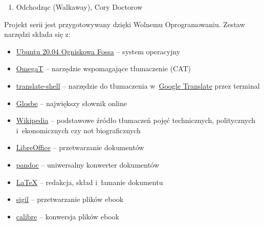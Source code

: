 \documentclass[oneside,polish,11pt,sfheadings]{mwbk}
\begin{document}
\begin{enumerate}
\item Odchodząc (Walkaway), Cory Doctorow
\end{enumerate}

\newpage

Projekt serii jest przygotowywany dzięki Wolnemu Oprogramowaniu. Zestaw narzędzi składa się z:
\begin{itemize}
\item \href{https://ubuntu.com/}{Ubuntu 20.04 Ogniskowa Fossa} -- system operacyjny
\item \href{https://omegat.org/}{OmegaT} -- narzędzie wspomagające tłumaczenie (CAT)
\item \href{https://github.com/soimort/translate-shell}{translate-shell} -- narzędzie do tłumaczenia w~\href{https://translate.google.pl}{Google Translate} przez terminal 
\item \href{https://glosbe.com/en/pl}{Glosbe} -- największy słownik online
\item \href{https://www.wikipedia.org/}{Wikipedia} -- podstawowe źródło tłumaczeń pojęć technicznych, politycznych i~ekonomicznych czy not biograficznych
\item \href{https://www.libreoffice.org/}{LibreOffice} -- przetwarzanie dokumentów 
\item \href{http://pandoc.org}{pandoc} -- uniwersalny konwerter dokumentów 
\item \href{https://www.latex-project.org/}{LaTeX} -- redakcja, skład i~łamanie dokumentu
\item \href{https://sigil-ebook.com/}{sigil} -- przetwarzanie plików ebook
\item \href{https://calibre-ebook.com/}{calibre} -- konwersja plików ebook
\end{itemize}




\tableofcontents{}
\end{document}
